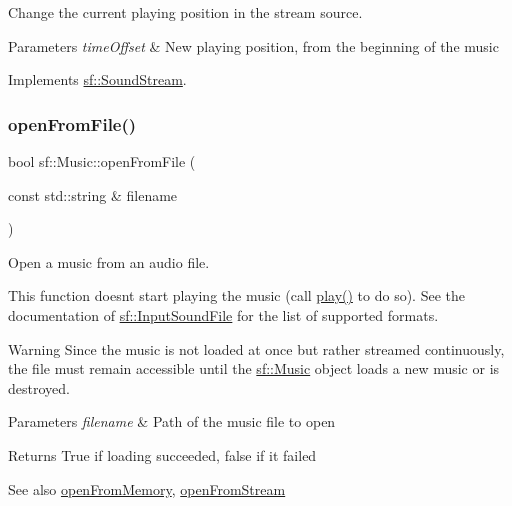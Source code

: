 Change the current playing position in the stream source. 


\begin{DoxyParams}{Parameters}
{\em time\+Offset} & New playing position, from the beginning of the music \\
\hline
\end{DoxyParams}


Implements \hyperlink{classsf_1_1_sound_stream_a907036dd2ca7d3af5ead316e54b75997}{sf\+::\+Sound\+Stream}.

\mbox{\label{classsf_1_1_music_a3edc66e5f5b3f11e84b90eaec9c7d7c0}} 
\subsubsection{\texorpdfstring{open\+From\+File()}{openFromFile()}}
{\footnotesize\ttfamily bool sf\+::\+Music\+::open\+From\+File (\begin{DoxyParamCaption}\item[{const std\+::string \&}]{filename }\end{DoxyParamCaption})}



Open a music from an audio file. 

This function doesn\textquotesingle{}t start playing the music (call \hyperlink{classsf_1_1_sound_stream_afdc08b69cab5f243d9324940a85a1144}{play()} to do so). See the documentation of \hyperlink{classsf_1_1_input_sound_file}{sf\+::\+Input\+Sound\+File} for the list of supported formats.

\begin{DoxyWarning}{Warning}
Since the music is not loaded at once but rather streamed continuously, the file must remain accessible until the \hyperlink{classsf_1_1_music}{sf\+::\+Music} object loads a new music or is destroyed.
\end{DoxyWarning}

\begin{DoxyParams}{Parameters}
{\em filename} & Path of the music file to open\\
\hline
\end{DoxyParams}
\begin{DoxyReturn}{Returns}
True if loading succeeded, false if it failed
\end{DoxyReturn}
\begin{DoxySeeAlso}{See also}
\hyperlink{classsf_1_1_music_ae93b21bcf28ff0b5fec458039111386e}{open\+From\+Memory}, \hyperlink{classsf_1_1_music_a4e55d1910a26858b44778c26b237d673}{open\+From\+Stream} 
\end{DoxySeeAlso}
\mbox{\label{classsf_1_1_music_ae93b21bcf28ff0b5fec458039111386e}} 
